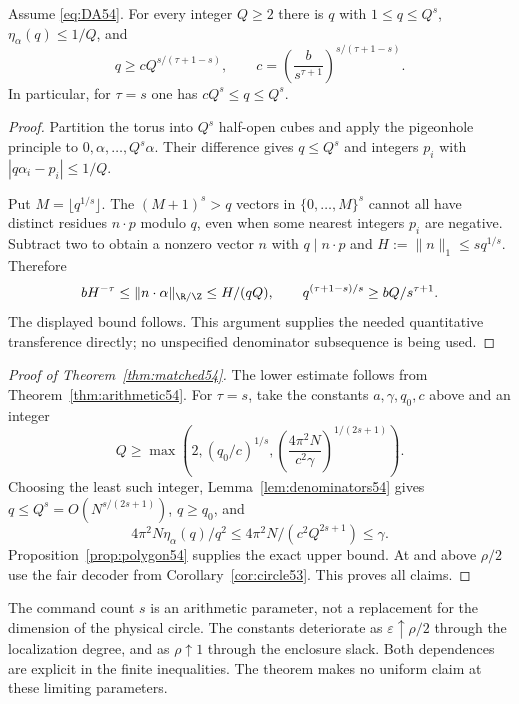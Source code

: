 \begin{lemma}\label{lem:denominators54}
Assume \eqref{eq:DA54}. For every integer $Q\ge2$ there is $q$ with $1\le q\le Q^s$, $\eta_\alpha(q)\le1/Q$, and
\[
 q\ge c Q^{s/(\tau+1-s)},\qquad
 c=\left(\frac{b}{s^{\tau+1}}\right)^{s/(\tau+1-s)}.
\]
In particular, for $\tau=s$ one has $cQ^s\le q\le Q^s$.
\end{lemma}
\begin{proof}
Partition the torus into $Q^s$ half-open cubes and apply the pigeonhole principle to $0,\alpha,\ldots,Q^s\alpha$. Their difference gives $q\le Q^s$ and integers $p_i$ with $|q\alpha_i-p_i|\le1/Q$.

Put $M=\lfloor q^{1/s}\rfloor$. The $(M+1)^s>q$ vectors in $\{0,\ldots,M\}^s$ cannot all have distinct residues $n\cdot p$ modulo $q$, even when some nearest integers $p_i$ are negative. Subtract two to obtain a nonzero vector $n$ with $q\mid n\cdot p$ and $H:=\|n\|_1\le s q^{1/s}$. Therefore
\[
 bH^{-\tau}\le\|n\cdot\alpha\|_{\R/\Z}
 \le H/(qQ),\qquad
 q^{(\tau+1-s)/s}\ge bQ/s^{\tau+1}.
\]
The displayed bound follows. This argument supplies the needed quantitative transference directly; no unspecified denominator subsequence is being used.
\end{proof}

\begin{proof}[Proof of Theorem~\ref{thm:matched54}]
The lower estimate follows from Theorem~\ref{thm:arithmetic54}. For $\tau=s$, take the constants $a,\gamma,q_0,c$ above and an integer
\[
 Q\ge\max\left(2,(q_0/c)^{1/s},
                \left(\frac{4\pi^2N}{c^2\gamma}\right)^{1/(2s+1)}\right).
\]
Choosing the least such integer, Lemma~\ref{lem:denominators54} gives $q\le Q^s=O(N^{s/(2s+1)})$, $q\ge q_0$, and
\[
 4\pi^2N\eta_\alpha(q)/q^2
 \le4\pi^2N/(c^2Q^{2s+1})\le\gamma.
\]
Proposition~\ref{prop:polygon54} supplies the exact upper bound. At and above $\rho/2$ use the fair decoder from Corollary~\ref{cor:circle53}. This proves all claims.
\end{proof}
The command count $s$ is an arithmetic parameter, not a replacement for the dimension of the physical circle. The constants deteriorate as $\varepsilon\uparrow\rho/2$ through the localization degree, and as $\rho\uparrow1$ through the enclosure slack. Both dependences are explicit in the finite inequalities. The theorem makes no uniform claim at these limiting parameters.

